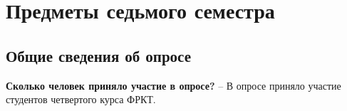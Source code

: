 \section{Предметы седьмого семестра}

    \subsection{Общие сведения об опросе}

    \textbf{Сколько человек приняло участие в опросе?} -- В опросе приняло участие  студентов четвертого курса ФРКТ.

    
    
    
    
    
    